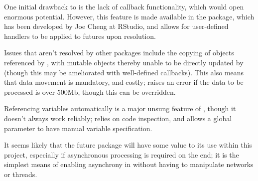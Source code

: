 One initial drawback to  is the lack of callback functionality, which would open enormous potential.
However, this feature is made available in the  package, which has been developed by Joe Cheng at RStudio, and allows for user-defined handlers to be applied to futures upon resolution\cite{Cheng19}.

Issues that aren't resolved by other packages include the copying of objects referenced by , with mutable objects thereby unable to be directly updated by  (though this may be ameliorated with well-defined callbacks).
This also means that data movement is mandatory, and costly;  raises an error if the data to be processed is over 500Mb, though this can be overridden.

Referencing variables automatically is a major unsung feature of , though it doesn't always work reliably;  relies on code inspection, and allows a global parameter to have manual variable specification.

It seems likely that the future package will have some value to its use within this project, especially if asynchronous processing is required on the \R{} end; it is the simplest means of enabling asynchrony in \R{} without having to manipulate networks or threads.
